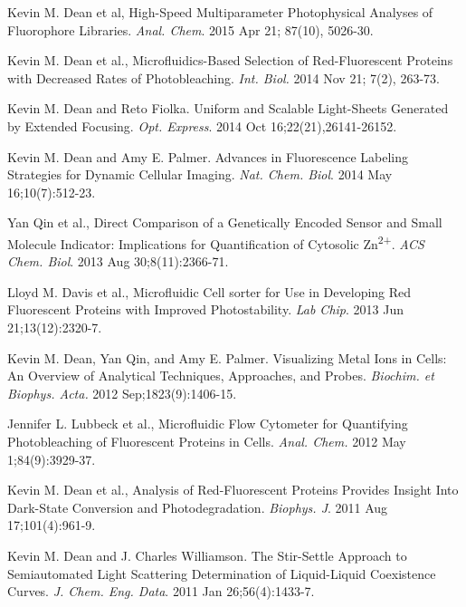 \documentclass[10pt]{res}
\begin{document}
\begin{resume}
\begin{etaremune}
\item Kevin M. Dean et al,  High-Speed Multiparameter Photophysical Analyses  of Fluorophore Libraries. {\it Anal. Chem}.  2015 Apr 21; 87(10), 5026-30.

\item Kevin M. Dean et al., Microfluidics-Based Selection of Red-Fluorescent Proteins with Decreased Rates of Photobleaching.  {\it Int. Biol.}  2014 Nov 21; 7(2), 263-73.

\item Kevin M. Dean and Reto Fiolka.  Uniform and Scalable Light-Sheets Generated by Extended Focusing.  {\it Opt. Express}.  2014  Oct 16;22(21),26141-26152.

\item Kevin M. Dean and Amy E. Palmer.  Advances in Fluorescence Labeling Strategies for Dynamic Cellular Imaging.   {\it Nat. Chem. Biol}. 2014 May 16;10(7):512-23. 

\item Yan Qin et al., Direct Comparison of a Genetically Encoded Sensor and Small Molecule Indicator: Implications for Quantification of Cytosolic Zn\textsuperscript{2+}. {\it ACS Chem. Biol}. 2013 Aug 30;8(11):2366-71.

\item Lloyd M. Davis et al., Microfluidic Cell sorter for Use in Developing Red Fluorescent Proteins with Improved Photostability. {\it Lab Chip}. 2013 Jun 21;13(12):2320-7.

\item Kevin M. Dean, Yan Qin, and Amy E. Palmer.  Visualizing Metal Ions in Cells:  An Overview of Analytical Techniques, Approaches, and Probes. {\it Biochim. et Biophys. Acta.}  2012  Sep;1823(9):1406-15.

\item Jennifer L. Lubbeck et al., Microfluidic Flow Cytometer for Quantifying Photobleaching of Fluorescent Proteins in Cells. {\it Anal. Chem.} 2012 May 1;84(9):3929-37.

\item Kevin M. Dean et al., Analysis of Red-Fluorescent Proteins Provides Insight Into Dark-State Conversion and Photodegradation.  {\it Biophys. J}. 2011 Aug 17;101(4):961-9.

\item Kevin M. Dean and J. Charles Williamson. The Stir-Settle Approach to Semiautomated Light Scattering Determination of Liquid-Liquid Coexistence Curves.  {\it J. Chem. Eng. Data}.  2011 Jan 26;56(4):1433-7. 


\end{etaremune}
\end{resume}
\end{document}
